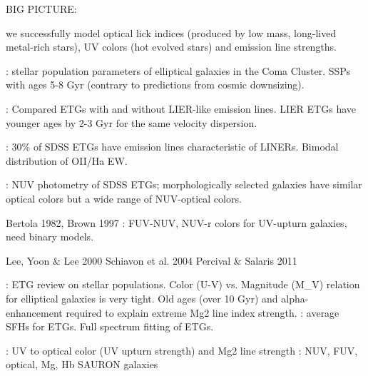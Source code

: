 

BIG PICTURE:

   we successfully model optical lick indices (produced by low mass, long-lived metal-rich stars), UV colors (hot evolved stars) and emission line strengths.


\citet{Trager+2008}: stellar population parameters of elliptical galaxies in the Coma Cluster. SSPs with ages 5-8 Gyr (contrary to predictions from cosmic downsizing).

\citet{Graves+2007}: Compared ETGs with and without LIER-like emission lines. LIER ETGs have younger ages by 2-3 Gyr for the same velocity dispersion.

\citet{Yan+2006}: 30\% of SDSS ETGs have emission lines characteristic of LINERs. Bimodal distribution of OII/Ha EW.

\citet{Yi+2005,Kaviraj+2007,Schawinski+2007}: NUV photometry of SDSS ETGs; morphologically selected galaxies have similar optical colors but a wide range of NUV-optical colors.


Bertola 1982, Brown 1997
\citet{Hernandez+2014}: FUV-NUV, NUV-r colors for UV-upturn galaxies, need binary models.

Lee, Yoon & Lee 2000
Schiavon et al. 2004
Percival & Salaris 2011

\citet{Renzini+2006}: ETG review on stellar populations. Color (U-V) vs. Magnitude (M_V) relation for elliptical galaxies is very tight. Old ages (over 10 Gyr) and alpha-enhancement required to explain extreme Mg2 line index strength.
\citet{Thomas+2005}: average SFHs for ETGs.
\citet{Choi+2014} Full spectrum fitting of ETGs.

\citet{Burstein+1988}: UV to optical color (UV upturn strength) and Mg2 line strength
\citet{Bureau+2011}: NUV, FUV, optical, Mg, Hb SAURON galaxies

